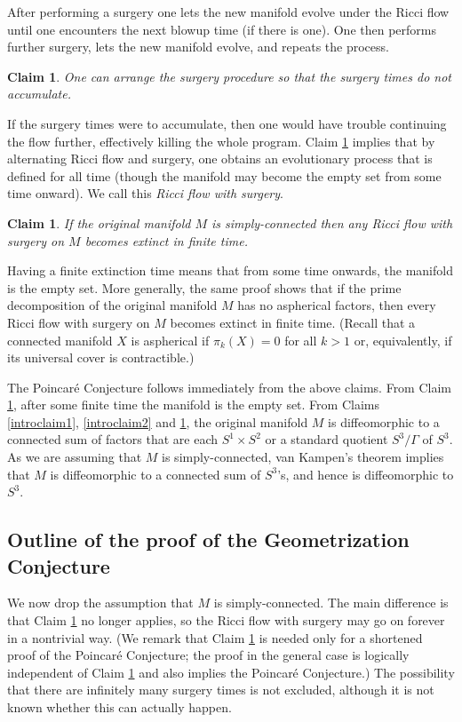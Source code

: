 \documentclass[12pt]{amsart}
\numberwithin{equation}{section}
\theoremstyle{plain}
\newtheorem{claim}[equation]{Claim}
\theoremstyle{definition}
\theoremstyle{remark}
\begin{document}
After performing a surgery one lets the new manifold evolve under
the Ricci flow until one encounters the next blowup time (if 
there is one).  One then performs further surgery, lets the new manifold
evolve, and repeats the process.

\begin{claim} \cite{Perelman2} \label{introclaim3}
One can arrange the surgery procedure so that the surgery times
do not accumulate.
\end{claim}

If the surgery times were to accumulate, then one would have trouble continuing
the flow further, effectively killing the whole program.
Claim \ref{introclaim3} implies that by alternating Ricci flow and surgery,
one  obtains an evolutionary process that is defined for all time  
(though the manifold may become the empty set from some time
onward).  We call this   {\em Ricci flow with surgery}. 


\begin{claim} \cite{Colding-Minicozzi,Colding-Minicozzi2,Perelman3} 
\label{introclaim4}
If the original manifold $M$ is simply-connected then any Ricci flow with
surgery on $M$ becomes extinct in finite time.
\end{claim}

Having a finite extinction time means that from some time onwards, the
manifold is the empty set. 
More generally, the same proof shows that
if the prime decomposition of the original manifold $M$ 
has no aspherical factors, then every Ricci flow with surgery on $M$
becomes extinct in finite time.
(Recall that a connected manifold $X$ is aspherical if
$\pi_k(X) = 0$ for all $k > 1$ or, equivalently, if its
universal cover is contractible.)

The Poincar\'e Conjecture follows immediately from the above claims.
From Claim \ref{introclaim4}, 
after some finite time the manifold is the empty set. 
From Claims \ref{introclaim1}, \ref{introclaim2} and \ref{introclaim3},
the original manifold $M$ is diffeomorphic to a connected sum of
factors that are each $S^1 \times S^2$ or a standard quotient
$S^3/\Gamma$ of $S^3$. As we are assuming that $M$ is simply-connected,
van Kampen's theorem implies that $M$ is diffeomorphic to a connected
sum of $S^3$'s, and hence is diffeomorphic to $S^3$.





\subsection{Outline of the proof of the Geometrization Conjecture}
We now drop the assumption that $M$ is
simply-connected. The main difference is that
Claim \ref{introclaim4} no longer applies, so the Ricci flow with surgery may
go on forever in a nontrivial way.  (We remark that Claim \ref{introclaim4}
is needed only for a shortened proof of the Poincar\'e Conjecture; the proof
in the general case is logically independent of Claim \ref{introclaim4} and
also implies the Poincar\'e Conjecture.)
The possibility that there are infinitely many surgery times is
not excluded, although it is not
known whether this can actually happen.  
\end{document}
